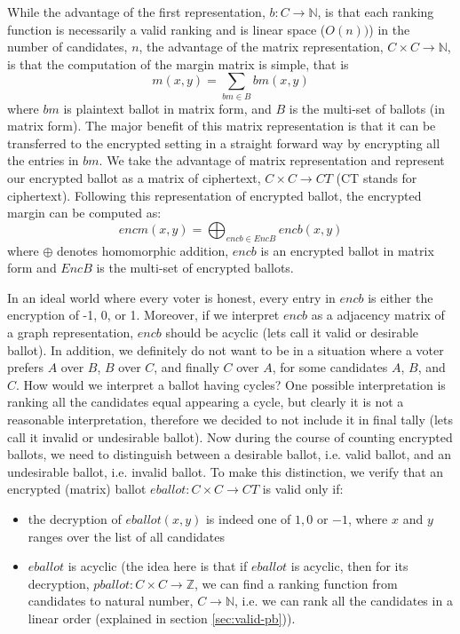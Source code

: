 While the advantage of the first representation, $b: C \to \mathbb{N}$,  is that each ranking
function is necessarily a valid ranking and is linear space ($O(n))$) in the number 
of candidates, $n$, the advantage of the matrix 
representation, $C \times C \to \mathbb{N}$,  is that the computation of
the margin matrix is simple, that is
\[ m(x, y) = \sum_{bm \in B} bm(x, y) \]
where $bm$ is plaintext ballot in matrix form,  and $B$ is the multi-set of ballots (in matrix form). 
The major benefit of this
matrix representation is that it can  be transferred to the encrypted setting in a straight
forward way by encrypting all the entries in $bm$.  We take the advantage of 
matrix representation and represent our encrypted ballot as a matrix of ciphertext, $C \times C \to CT$ (CT stands for ciphertext). 
Following this representation of encrypted ballot,  the encrypted margin can be computed as:
\begin{equation}\label{eqn:enc-mm}
encm(x, y) = \bigoplus_{encb \in EncB} encb(x, y) 
\end{equation}
where $\oplus$ denotes homomorphic addition, $encb$ is an encrypted
ballot in matrix form and $EncB$ is the multi-set of
encrypted ballots. 

 In an ideal world where every voter is honest, 
every entry in $encb$ is either the encryption of -1, 0, or 1. 
Moreover, if we interpret $encb$ as a adjacency matrix of a graph representation, 
$encb$ should be acyclic (lets call it valid or desirable  ballot).  
In addition,  we definitely do not want to be 
in a situation where a voter prefers $A$ over $B$,  $B$ over $C$, 
and finally $C$ over $A$, for some candidates $A$, $B$, and $C$.  
How would we interpret a ballot having cycles? One possible interpretation 
is ranking all the candidates equal appearing a cycle, but clearly it is not a
reasonable interpretation, therefore we 
decided to not include it in final tally (lets call it invalid or undesirable ballot). 
Now during the course of counting encrypted ballots, we need to 
distinguish between a  desirable 
ballot, i.e.  valid ballot, and an undesirable ballot, i.e. invalid ballot.  
To make this distinction,  we verify that 
an encrypted (matrix) ballot $eballot : C \times C \to CT$ is valid only if:
\begin{itemize}
\item  the decryption of $eballot(x, y)$ is indeed one of $1, 0$ or $-1$, where $x$ and $y$ ranges over the list of all candidates
\item  $eballot$ is acyclic (the idea here is that if $eballot$ is acyclic,  then for its decryption, $pballot: C \times C \to \mathbb{Z}$, 
	we can find a ranking function from candidates to natural number, $C \to \mathbb{N}$,  i.e. we can rank all the candidates in a
	linear order (explained in section \ref{sec:valid-pb})).
\end{itemize}

